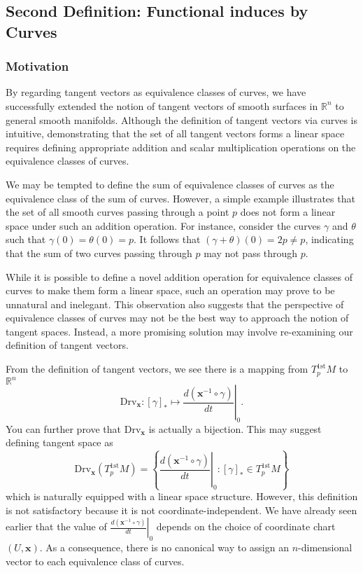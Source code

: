 \documentclass{report}
\begin{document}
\subsection{Second Definition: Functional induces by Curves}
\subsubsection{Motivation}
By regarding tangent vectors as equivalence classes of curves, we have successfully extended the notion of tangent vectors of smooth surfaces in $\mathbb{R}^n$ to general smooth manifolds. Although the definition of tangent vectors via curves is intuitive, demonstrating that the set of all tangent vectors forms a linear space requires defining appropriate addition and scalar multiplication operations on the equivalence classes of curves. 

We may be tempted to define the sum of equivalence classes of curves as the equivalence class of the sum of curves. However, a simple example illustrates that the set of all smooth curves passing through a point $p$ does not form a linear space under such an addition operation. For instance, consider the curves $\gamma$ and $\theta$ such that $\gamma(0)=\theta(0)=p$. It follows that $(\gamma+\theta)(0)=2p\neq p$, indicating that the sum of two curves passing through $p$ may not pass through $p$.

While it is possible to define a novel addition operation for equivalence classes of curves to make them form a linear space, such an operation may prove to be unnatural and inelegant. This observation also suggests that the perspective of equivalence classes of curves may not be the best way to approach the notion of tangent spaces. Instead, a more promising solution may involve re-examining our definition of tangent vectors.

From the definition of tangent vectors, we see there is a mapping from $T_p^{1\mathrm{st}}M$ to $\mathbb{R}^n$
\[
    \mathrm{Drv}_{\mathbf{x}}:[\gamma]_*\longmapsto\left.\frac{d(\mathbf{x}^{-1} \circ \gamma)}{dt}\right|_0.
\]
You can further prove that $\mathrm{Drv}_{\mathbf{x}}$ is actually a bijection. This may suggest defining tangent space as
\[
    \mathrm{Drv}_{\mathbf{x}}\left(T_p^{1\mathrm{st}}M\right)=\left\{\left.\frac{d(\mathbf{x}^{-1} \circ \gamma)}{dt}\right|_0: [\gamma]_*\in T_p^{1\mathrm{st}}M \right\}
\]
which is naturally equipped with a linear space structure. However, this definition is not satisfactory because it is not coordinate-independent. We have already seen earlier that the value of $\left.\frac{d(\mathbf{x}^{-1} \circ \gamma)}{dt}\right|_0$ depends on the choice of coordinate chart $(U,\mathbf{x})$. As a consequence,  there is no canonical way to assign an $n$-dimensional vector to each equivalence class of curves. 
\end{document}
